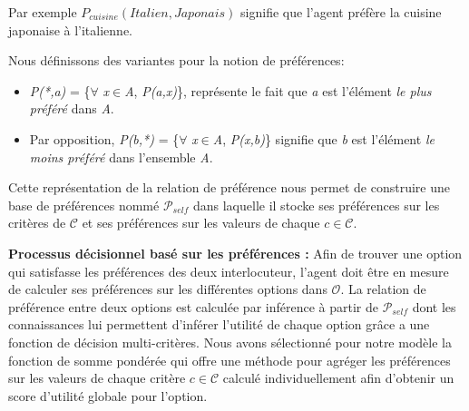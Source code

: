 \documentclass [french]{sig-alternate-05-2015}
\begin{document}
Par exemple $P_{cuisine} (Italien, Japonais)$ signifie que l'agent préfère la cuisine japonaise à l'italienne. 

\par Nous définissons des variantes pour la notion de préférences:
\begin{itemize}
	\item  \emph{P(*,a)}  = \{$\forall$ \emph{x}$\in$\emph{A}, \emph{P(a,x)}\}, représente le fait que  \emph{a} est l'élément  \textit{le plus préféré} dans \emph{A}.
	\item Par opposition, \emph{P(b,*)} = \{$\forall$ \emph{x}$\in$\emph{A}, \emph{P(x,b)}\} signifie que \emph{b} est l'élément \textit{le moins préféré} dans l'ensemble \emph{A}. 
\end{itemize}

\par Cette représentation de la relation de préférence nous permet de construire une base de préférences nommé $\mathcal{P}_{self}$ dans laquelle il stocke ses préférences sur les critères de $\mathcal{C}$ et ses préférences sur les valeurs de chaque $ c \in \mathcal{C}$. 
%
%
\par  \textbf{Processus décisionnel basé sur les préférences :} 
Afin de trouver une option qui satisfasse les préférences des deux interlocuteur, l'agent doit être en mesure de calculer ses préférences sur les différentes options dans $\mathcal{O}$. La relation de préférence entre deux options est calculée par inférence à partir de $\mathcal{P}_{self}$ dont les connaissances lui permettent d'inférer l'utilité de chaque option grâce a une fonction de décision multi-critères. 
Nous avons sélectionné pour notre modèle la fonction de somme pondérée \cite{yager2012ordered} qui offre une méthode pour agréger les préférences sur les valeurs de chaque  critère $c \in \mathcal{C}$ calculé individuellement afin d'obtenir un score d'utilité globale pour l'option.
\end{document}
